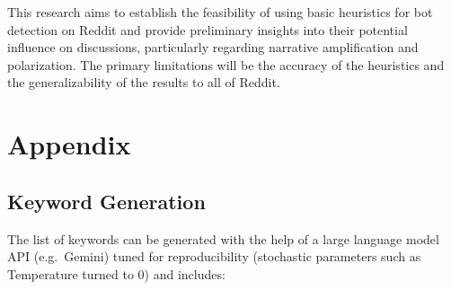 \documentclass[
  letterpaper,
  DIV=11,
  numbers=noendperiod]{scrartcl}
\begin{document}
This research aims to establish the feasibility of using basic
heuristics for bot detection on Reddit and provide preliminary insights
into their potential influence on discussions, particularly regarding
narrative amplification and polarization. The primary limitations will
be the accuracy of the heuristics and the generalizability of the
results to all of Reddit.

\newpage

\appendix

\section{Appendix}\label{appendix}

\subsection{Keyword Generation}\label{sec-keywords}

The list of keywords can be generated with the help of a large language
model API (e.g.~Gemini) tuned for reproducibility (stochastic parameters
such as Temperature turned to 0) and includes:
\end{document}
